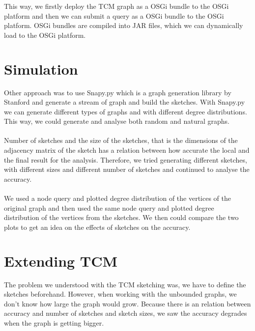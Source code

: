\documentclass[12pt]{report}
\numberwithin{figure}{section}
\numberwithin{table}{section}
\begin{document}
This way, we firstly deploy the TCM graph as a OSGi bundle to the OSGi platform and then we can submit a query as a OSGi bundle to the OSGi platform. OSGi bundles are compiled into JAR files, which we can dynamically load to the OSGi platform. 

\section{Simulation}

Other approach was to use Snapy.py which is a graph generation library by Stanford and generate a stream of graph and build the sketches.  With Snapy.py we can generate different types of graphs and with different degree distributions. This way, we could generate and analyse both random and natural graphs.


\paragraph{}

Number of sketches and the size of the sketches, that is the dimensions of the adjacency matrix of the sketch has a relation between how accurate the local and the final result for the analysis. Therefore, we tried generating different sketches, with different sizes and different number of sketches and continued to analyse the accuracy. 

\paragraph{}

We used a node query and plotted degree distribution of the vertices of the original graph and then used the same node query and plotted degree distribution of the vertices from the sketches. We then could compare the two plots to get an idea on the effects of sketches on the accuracy. 

\section{Extending TCM}

The problem we understood with the TCM sketching was, we have to define the sketches beforehand. However, when working with the unbounded graphs, we don’t know how large the graph would grow. Because there is an relation between accuracy and number of sketches and sketch sizes, we saw the accuracy degrades when the graph is getting bigger. 
\end{document}
